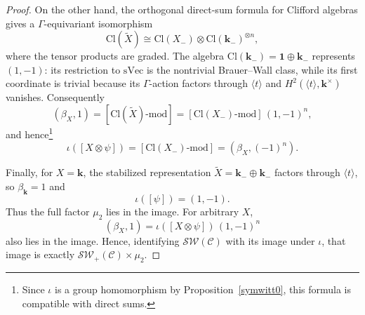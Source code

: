 \documentclass[12pt]{amsart}
\numberwithin{equation}{section}
\providecommand{\k}{}\renewcommand{\k}{\mathbf{k}}
\providecommand{\C}{}\renewcommand{\C}{\mathcal{C}}
\providecommand{\sVec}{}\renewcommand{\sVec}{\mathrm{sVec}}
\providecommand{\Cl}{}\renewcommand{\Cl}{\mathrm{Cl}}
\theoremstyle{plain}
\theoremstyle{definition}
\theoremstyle{remark}
\begin{document}
\begin{proof}
On the other hand, the orthogonal direct-sum formula for Clifford algebras gives a $\Gamma$-equivariant isomorphism
\[
\Cl({\widetilde X})\cong\Cl(X_-)\otimes\Cl(\k_-)^{\otimes n},
\]
where the tensor products are graded. The algebra $\Cl(\k_-)=\mathbf 1\oplus\k_-$ represents $(1,-1)$: its restriction to $\sVec$ is the nontrivial Brauer--Wall class, while its first coordinate is trivial because its $\Gamma$-action factors through $\langle t\rangle$ and $H^2(\langle t\rangle,\k^\times)$ vanishes. Consequently
\[
(\beta_X,1)=[\Cl({\widetilde X})\text{-mod}]
=[\Cl(X_-)\text{-mod}]\,(1,-1)^n,
\]
and hence\footnote{Since $\iota$ is a group homomorphism by Proposition~\ref{symwitt0},
this formula is compatible with direct sums.}
\[
\iota([X\otimes\psi])=[\Cl(X_-)\text{-mod}]
=(\beta_X,(-1)^n).
\]

Finally, for $X=\k$, the stabilized representation ${\widetilde X}=\k_-\oplus\k_-$ factors through $\langle t\rangle$, so $\beta_\k=1$ and
\[
\iota([\psi])=(1,-1).
\]
Thus the full factor $\mu_2$ lies in the image. For arbitrary $X$,
\[
(\beta_X,1)=\iota([X\otimes\psi])\,(1,-1)^n
\]
also lies in the image. Hence, identifying ${\mathcal S\mathcal W}(\C)$ with its image under $\iota$, that image is exactly $\mathcal S\mathcal W_+(\C)\times\mu_2$.
\end{proof}
\end{document}
